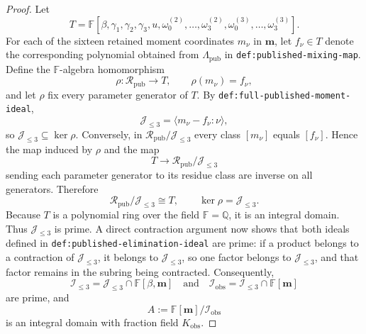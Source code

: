 \documentclass{article}
\begin{document}
\begin{proof}
Let
\[
T=\mathbb F[\beta,\gamma_1,\gamma_2,\gamma_3,u,
\omega^{(2)}_0,\ldots,\omega^{(2)}_3,
\omega^{(3)}_0,\ldots,\omega^{(3)}_3].
\]
For each of the sixteen retained moment coordinates \(m_\nu\) in \(\mathbf m\), let \(f_\nu\in T\) denote the corresponding polynomial obtained from \(\Lambda_{\mathrm{pub}}\) in \texttt{def:published-mixing-map}.  Define the \(\mathbb F\)-algebra homomorphism
\[
\rho:\mathcal R_{\mathrm{pub}}\longrightarrow T,
\qquad
\rho(m_\nu)=f_\nu,
\]
and let \(\rho\) fix every parameter generator of \(T\).  By \texttt{def:full-published-moment-ideal},
\[
\mathcal J_{\leq3}=\langle m_\nu-f_\nu:\nu\rangle,
\]
so \(\mathcal J_{\leq3}\subseteq\ker\rho\).  Conversely, in \(\mathcal R_{\mathrm{pub}}/\mathcal J_{\leq3}\) every class \([m_\nu]\) equals \([f_\nu]\).  Hence the map induced by \(\rho\) and the map
\[
T\longrightarrow\mathcal R_{\mathrm{pub}}/\mathcal J_{\leq3}
\]
sending each parameter generator to its residue class are inverse on all generators.  Therefore
\[
\mathcal R_{\mathrm{pub}}/\mathcal J_{\leq3}\cong T,
\qquad
\ker\rho=\mathcal J_{\leq3}.
\]
Because \(T\) is a polynomial ring over the field \(\mathbb F=\mathbb Q\), it is an integral domain.  Thus \(\mathcal J_{\leq3}\) is prime.  A direct contraction argument now shows that both ideals defined in \texttt{def:published-elimination-ideal} are prime: if a product belongs to a contraction of \(\mathcal J_{\leq3}\), it belongs to \(\mathcal J_{\leq3}\), so one factor belongs to \(\mathcal J_{\leq3}\), and that factor remains in the subring being contracted.  Consequently,
\[
\mathcal I_{\leq3}=\mathcal J_{\leq3}\cap\mathbb F[\beta,\mathbf m]
\quad\text{and}\quad
\mathcal I_{\mathrm{obs}}=\mathcal I_{\leq3}\cap\mathbb F[\mathbf m]
\]
are prime, and
\[
A:=\mathbb F[\mathbf m]/\mathcal I_{\mathrm{obs}}
\]
is an integral domain with fraction field \(K_{\mathrm{obs}}\).


\end{proof}
\end{document}
